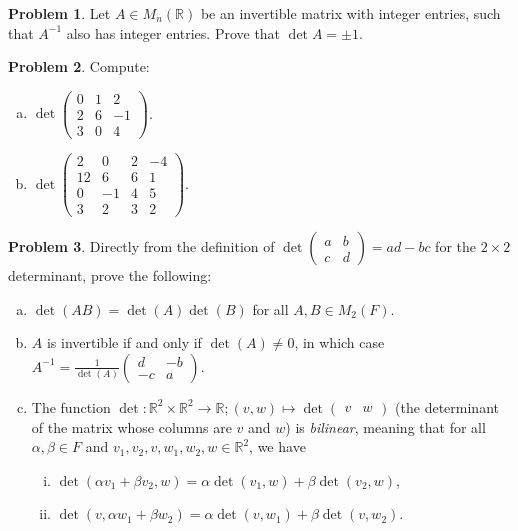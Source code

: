 \documentclass[11pt,oneside]{amsart}
\theoremstyle{definition}
\newtheorem{problem}{Problem}
\newcommand{\bR}{\mathbb{R}}
\begin{document}
    \begin{problem}
        Let $A\in M_n(\bR)$ be an invertible matrix with integer entries, such that $A^{-1}$ also has integer entries. Prove that $\det A=\pm 1$.
    \end{problem}

    \newpage

    \begin{problem}
        Compute:
        \begin{enumerate}[(a)]
            \item $\det\begin{pmatrix}
                0&1&2\\2&6&-1\\3&0&4
            \end{pmatrix}$.
            \item $\det\begin{pmatrix}
                2&0&2&-4\\12&6&6&1\\0&-1&4&5\\3&2&3&2
            \end{pmatrix}$.
        \end{enumerate}
    \end{problem}

    \begin{problem}
        Directly from the definition of $\det\begin{pmatrix}
            a&b\\c&d
        \end{pmatrix}=ad-bc$ for the $2\times 2$ determinant, prove the following:
        \begin{enumerate}[(a)]
            \item $\det(AB)=\det(A)\det(B)$ for all $A,B\in M_2(F)$.
            \item $A$ is invertible if and only if $\det(A)\neq 0$, in which case $A^{-1}=\frac 1{\det(A)}\begin{pmatrix}
                d&-b\\-c&a
            \end{pmatrix}$.
            \item The function $\det\colon \bR^2\times\bR^2\to\bR; (v,w)\mapsto \det\begin{pmatrix}
                v&w
            \end{pmatrix}$ (the determinant of the matrix whose columns are $v$ and $w$) is \emph{bilinear}, meaning that for all $\alpha,\beta\in F$ and $v_1,v_2,v,w_1,w_2,w\in\bR^2$, we have
            \begin{enumerate}[(i)]
                \item $\det(\alpha v_1+\beta v_2,w)=\alpha\det(v_1,w)+\beta\det(v_2,w)$,
                \item $\det(v,\alpha w_1+\beta w_2)=\alpha\det(v,w_1)+\beta\det(v,w_2)$.
            \end{enumerate}
        \end{enumerate}
    \end{problem}
\end{document}
